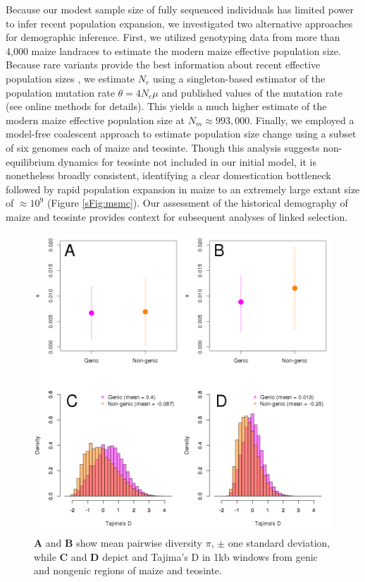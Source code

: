 \documentclass[12pt,a4paper]{article}
\begin{document}
Because our modest sample size of fully sequenced individuals has limited power to infer recent population expansion, we investigated two alternative approaches for demographic inference.  
First, we utilized genotyping data from more than 4,000 maize landraces \cite{Hearne2015} to estimate the modern maize effective population size.
Because rare variants provide the best information about recent effective population sizes \cite{keinan2012}, we estimate $N_e$ using  a singleton-based estimator \cite{fu1993} of the population mutation rate $\theta=4N_e\mu$  and published values of the mutation rate \cite{clark2005} (see online methods for details). 
This yields a much higher estimate of the modern maize effective population size at  $N_m \approx 993,000$.
Finally, we employed a model-free coalescent approach \cite{schiffels2014} to estimate population size change using a subset of six genomes each of maize and teosinte.
Though this analysis suggests non-equilibrium dynamics for teosinte not included in our initial model, it is nonetheless broadly consistent, identifying a clear domestication bottleneck followed by rapid population expansion in maize to an extremely large extant size of $\approx 10^9$ (Figure \ref{sFig:msmc}).
Our assessment of the historical demography of maize and teosinte provides context for subsequent analyses of linked selection.


\begin{figure}[!tb]
  \begin{center}
  \includegraphics[width=.45\textwidth] {FigsAndFiles/Pi_and_Tajima.png}
\end{center}
\caption{\textbf{A} and \textbf{B} show mean pairwise diversity $\pi$, $\pm$ one standard deviation, while \textbf{C} and \textbf{D} depict and Tajima's D in 1kb windows from genic and nongenic regions of maize and teosinte.   \label{fig:diversity} }
\end{figure}
\end{document}
